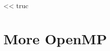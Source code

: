 \begin{savequote}[6cm]
<< truc
\end{savequote}

\chapter{More OpenMP}\label{chap:perspectives}
\chaptertoc

%

